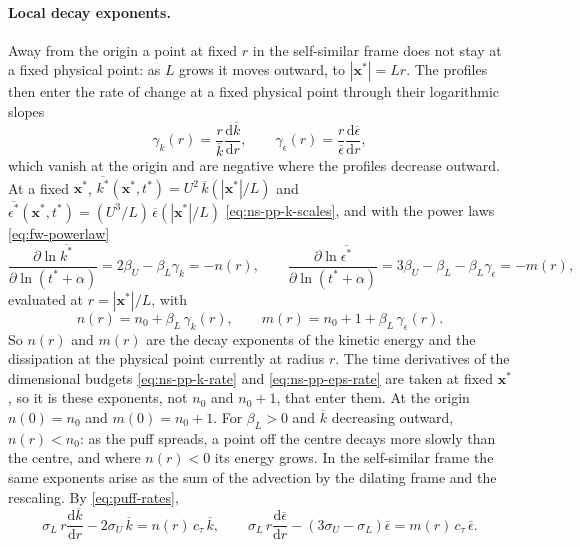 \documentclass{article}
\begin{document}
\paragraph{Local decay exponents.}
Away from the origin a point at fixed $r$ in the self-similar frame does not
stay at a fixed physical point: as $L$ grows it moves outward, to
$|\mathbf{x}^*| = L r$. The profiles then enter the rate of change at a fixed
physical point through their logarithmic slopes
\begin{equation}\label{eq:puff-gamma}
  \gamma_k(r) = \frac{r}{\overline{k}} \frac{\mathrm{d} \overline{k}}{\mathrm{d} r} ,
  \qquad
  \gamma_\epsilon(r) = \frac{r}{\overline{\epsilon}} \frac{\mathrm{d} \overline{\epsilon}}{\mathrm{d} r} ,
\end{equation}
which vanish at the origin and are negative where the profiles decrease
outward. At a fixed $\mathbf{x}^*$,
$\overline{k^*}(\mathbf{x}^*, t^*) = U^2\, \overline{k}(|\mathbf{x}^*|/L)$ and
$\overline{\epsilon^*}(\mathbf{x}^*, t^*) = (U^3/L)\, \overline{\epsilon}(|\mathbf{x}^*|/L)$
\eqref{eq:ns-pp-k-scales}, and with the power laws \eqref{eq:fw-powerlaw}
\begin{equation*}
  \frac{\partial \ln \overline{k^*}}{\partial \ln (t^* + \alpha)}
  = 2\beta_U - \beta_L \gamma_k = -n(r) ,
  \qquad
  \frac{\partial \ln \overline{\epsilon^*}}{\partial \ln (t^* + \alpha)}
  = 3\beta_U - \beta_L - \beta_L \gamma_\epsilon = -m(r) ,
\end{equation*}
evaluated at $r = |\mathbf{x}^*|/L$, with
\begin{equation}\label{eq:puff-nm}
  n(r) = n_0 + \beta_L\, \gamma_k(r) ,
  \qquad
  m(r) = n_0 + 1 + \beta_L\, \gamma_\epsilon(r) .
\end{equation}
So $n(r)$ and $m(r)$ are the decay exponents of the kinetic energy and the
dissipation at the physical point currently at radius $r$. The time
derivatives of the dimensional budgets \eqref{eq:ns-pp-k-rate} and
\eqref{eq:ns-pp-eps-rate} are taken at fixed $\mathbf{x}^*$, so it is these
exponents, not $n_0$ and $n_0 + 1$, that enter them. At the origin
$n(0) = n_0$ and $m(0) = n_0 + 1$. For $\beta_L > 0$ and $\overline{k}$
decreasing outward, $n(r) < n_0$: as the puff spreads, a point off the centre
decays more slowly than the centre, and where $n(r) < 0$ its energy grows. In
the self-similar frame the same exponents arise as the sum of the advection by
the dilating frame and the rescaling. By \eqref{eq:puff-rates},
\begin{equation}\label{eq:puff-rescaling-nm}
  \sigma_L\, r \frac{\mathrm{d} \overline{k}}{\mathrm{d} r} - 2\sigma_U\, \overline{k}
  = n(r)\, c_\tau\, \overline{k} ,
  \qquad
  \sigma_L\, r \frac{\mathrm{d} \overline{\epsilon}}{\mathrm{d} r} - \left( 3\sigma_U - \sigma_L \right) \overline{\epsilon}
  = m(r)\, c_\tau\, \overline{\epsilon} .
\end{equation}
\end{document}

